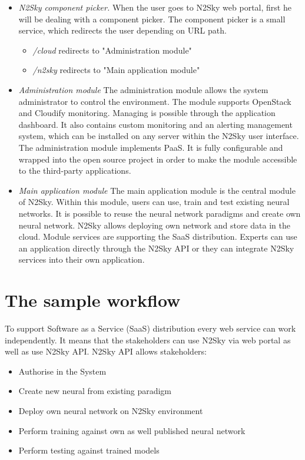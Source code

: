\documentclass[10pt, conference, compsocconf]{IEEEtran}
\begin{document}
\begin{itemize}
\item \emph{N2Sky component picker.} When the user goes to N2Sky web portal, first he will be dealing with a component picker. The component picker is a small service, which redirects the user depending on URL path.
\begin{itemize}
\item \emph{/cloud} redirects to "Administration module"
\item \emph{/n2sky} redirects to "Main application module"
\end{itemize}

\item \emph{Administration module} The administration module allows the system administrator to control the environment. The module supports OpenStack and Cloudify monitoring. Managing is possible through the application dashboard. It also contains custom monitoring and an alerting management system, which can be installed on any server within the N2Sky user interface. The administration module implements PaaS. It is fully configurable and wrapped into the open source project in order to make the module accessible to the third-party applications. 
\item \emph{Main application module} The main application module is the central module of N2Sky. Within this module, users can use, train and test existing neural networks. It is possible to reuse the neural network paradigms and create own neural network. N2Sky allows deploying own network and store data in the cloud. Module services are supporting the SaaS distribution. Experts can use an application directly through the N2Sky API or they can integrate N2Sky services into their own application. 
\end{itemize}

\section{The sample workflow}


To support Software as a Service (SaaS) distribution every web service can work independently. It means that the stakeholders can use N2Sky via web portal as well as use N2Sky API.
N2Sky API allows  stakeholders:

\begin{itemize}
\item Authorise in the System
\item Create new neural from existing paradigm
\item Deploy own neural network on N2Sky environment 
\item Perform training against own as well published neural network
\item Perform testing against trained models
\end{itemize}
\end{document}

